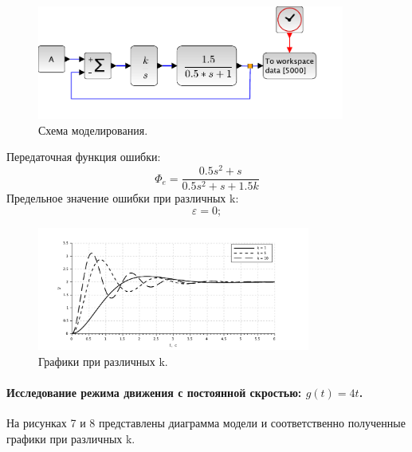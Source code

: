 \documentclass[a3paper, 11pt]{article}
\begin{document}
\begin{minipage}[t]{0.5\textwidth}
    \begin{figure}[H]
        \centering
        \includegraphics[width = 0.9\textwidth]{images/model2-1.pdf}
        \caption{Схема моделирования.}
    \end{figure}
\end{minipage}
\begin{minipage}[t]{0.5\textwidth}
    \vspace{0.5cm}
    Передаточная функция ошибки:
    \begin{equation}
        \Phi_e = \frac{0.5s^2 + s}{0.5s^2 + s + 1.5k}
    \end{equation}
    Предельное значение ошибки при различных k:
    \begin{equation*}
        \varepsilon = 0;
    \end{equation*}
\end{minipage}

\begin{figure}[h!]
    \centering
    \includegraphics[width = 0.8\textwidth]{images/graph2-1.pdf}
    \caption{Графики при различных k.}
\end{figure}

\paragraph{Исследование режима движения с постоянной скростью: $g(t) = 4t$.} На рисунках 7 и 8 представлены диаграмма модели и соответственно полученные графики при различных k.
\end{document}
